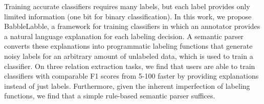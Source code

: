 Training accurate classifiers requires many labels, but each label provides only limited information (one bit for binary classification). In this work, we propose BabbleLabble, a framework for training classifiers in which an annotator provides a natural language explanation for each labeling decision. A semantic parser converts these explanations into programmatic labeling functions that generate noisy labels for an arbitrary amount of unlabeled data, which is used to train a classifier. On three relation extraction tasks, we find that users are able to train classifiers with comparable F1 scores from 5-100 faster by providing explanations instead of just labels. Furthermore, given the inherent imperfection of labeling functions, we find that a simple rule-based semantic parser suffices.
